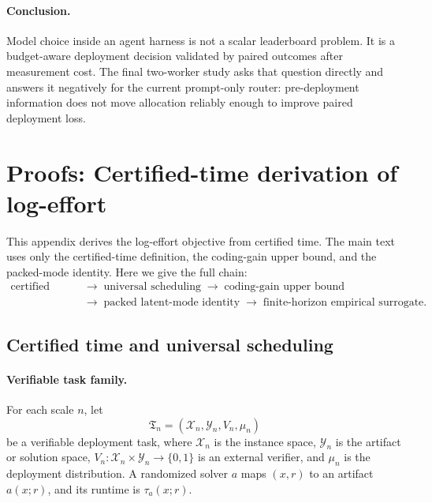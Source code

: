 \documentclass{article}
\newcommand{\cX}{\mathcal{X}}
\newcommand{\cY}{\mathcal{Y}}
\begin{document}
\paragraph{Conclusion.}
Model choice inside an agent harness is not a scalar leaderboard problem.
It is a budget-aware deployment decision validated by paired outcomes after measurement cost.
The final two-worker study asks that question directly and answers it negatively for the current prompt-only router: pre-deployment information does not move allocation reliably enough to improve paired deployment loss.




\appendix



\section{Proofs: Certified-time derivation of log-effort}
\label{app:certified-log-effort}

This appendix derives the log-effort objective from certified time.
The main text uses only the certified-time definition, the coding-gain upper bound, and the
packed-mode identity.  Here we give the full chain:
\[
\begin{aligned}
    \text{certified time}
    &\;\longrightarrow\;
    \text{universal scheduling}
    \;\longrightarrow\;
    \text{coding-gain upper bound}
    \\
    &\;\longrightarrow\;
    \text{packed latent-mode identity}
    \;\longrightarrow\;
    \text{finite-horizon empirical surrogate}.
\end{aligned}
\]

\subsection{Certified time and universal scheduling}

\paragraph{Verifiable task family.}
For each scale \(n\), let
\[
    \mathfrak T_n=(\cX_n,\cY_n,V_n,\mu_n)
\]
be a verifiable deployment task, where \(\cX_n\) is the instance space, \(\cY_n\) is the
artifact or solution space, \(V_n:\cX_n\times\cY_n\to\{0,1\}\) is an external verifier, and
\(\mu_n\) is the deployment distribution.
A randomized solver \(a\) maps \((x,r)\) to an artifact \(a(x;r)\), and its runtime is
\(\tau_a(x;r)\).
\end{document}
